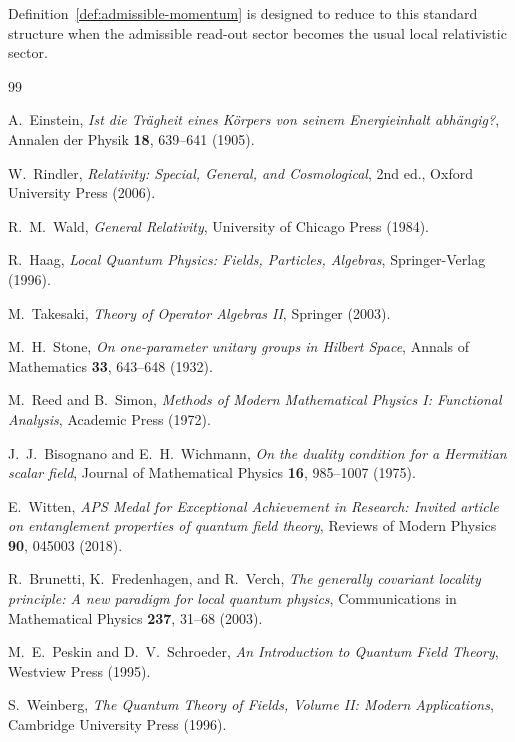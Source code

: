 \documentclass[12pt,a4paper]{article}
\theoremstyle{definition}
\theoremstyle{remark}
\begin{document}
Definition~\ref{def:admissible-momentum} is designed to reduce to this standard structure when the admissible read-out sector becomes the usual local relativistic sector.

\begin{thebibliography}{99}

A.~Einstein, \emph{Ist die Tr\"agheit eines K\"orpers von seinem Energieinhalt abh\"angig?}, Annalen der Physik \textbf{18}, 639--641 (1905).

W.~Rindler, \emph{Relativity: Special, General, and Cosmological}, 2nd ed., Oxford University Press (2006).

R.~M.~Wald, \emph{General Relativity}, University of Chicago Press (1984).

R.~Haag, \emph{Local Quantum Physics: Fields, Particles, Algebras}, Springer-Verlag (1996).

M.~Takesaki, \emph{Theory of Operator Algebras II}, Springer (2003).

M.~H.~Stone, \emph{On one-parameter unitary groups in Hilbert Space}, Annals of Mathematics \textbf{33}, 643--648 (1932).

M.~Reed and B.~Simon, \emph{Methods of Modern Mathematical Physics I: Functional Analysis}, Academic Press (1972).

J.~J.~Bisognano and E.~H.~Wichmann, \emph{On the duality condition for a Hermitian scalar field}, Journal of Mathematical Physics \textbf{16}, 985--1007 (1975).

E.~Witten, \emph{APS Medal for Exceptional Achievement in Research: Invited article on entanglement properties of quantum field theory}, Reviews of Modern Physics \textbf{90}, 045003 (2018).

R.~Brunetti, K.~Fredenhagen, and R.~Verch, \emph{The generally covariant locality principle: A new paradigm for local quantum physics}, Communications in Mathematical Physics \textbf{237}, 31--68 (2003).

M.~E.~Peskin and D.~V.~Schroeder, \emph{An Introduction to Quantum Field Theory}, Westview Press (1995).

S.~Weinberg, \emph{The Quantum Theory of Fields, Volume II: Modern Applications}, Cambridge University Press (1996).


\end{thebibliography}
\end{document}
